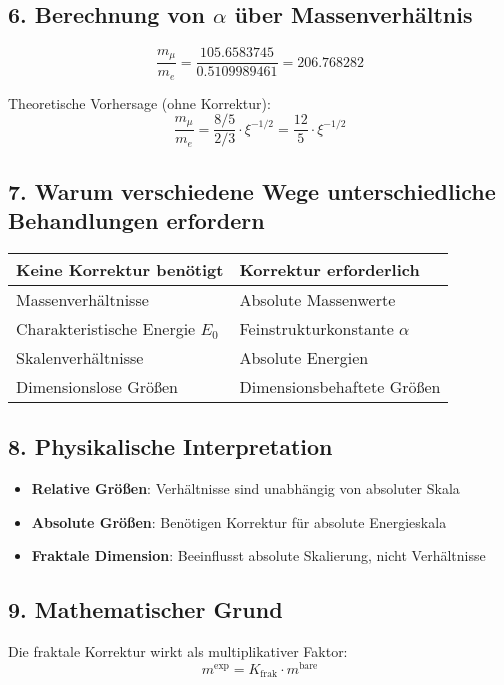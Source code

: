 \documentclass[12pt,a4paper]{article}
\begin{document}
\subsection{6. Berechnung von $\alpha$ über Massenverhältnis}

\[
\frac{m_\mu}{m_e} = \frac{105.6583745}{0.5109989461} = 206.768282
\]

Theoretische Vorhersage (ohne Korrektur):
\[
\frac{m_\mu}{m_e} = \frac{8/5}{2/3} \cdot \xi^{-1/2} = \frac{12}{5} \cdot \xi^{-1/2}
\]

\subsection{7. Warum verschiedene Wege unterschiedliche Behandlungen erfordern}

\begin{tabular}{p{}p{}}
	\textbf{Keine Korrektur benötigt} & \textbf{Korrektur erforderlich} \\
	\hline
	Massenverhältnisse & Absolute Massenwerte \\
	Charakteristische Energie $E_0$ & Feinstrukturkonstante $\alpha$ \\
	Skalenverhältnisse & Absolute Energien \\
	Dimensionslose Größen & Dimensionsbehaftete Größen \\
\end{tabular}

\subsection{8. Physikalische Interpretation}

\begin{itemize}
	\item \textbf{Relative Größen}: Verhältnisse sind unabhängig von absoluter Skala
	\item \textbf{Absolute Größen}: Benötigen Korrektur für absolute Energieskala
	\item \textbf{Fraktale Dimension}: Beeinflusst absolute Skalierung, nicht Verhältnisse
\end{itemize}

\subsection{9. Mathematischer Grund}

Die fraktale Korrektur wirkt als multiplikativer Faktor:
\[
m^{\text{exp}} = K_{\text{frak}} \cdot m^{\text{bare}}
\]
\end{document}

